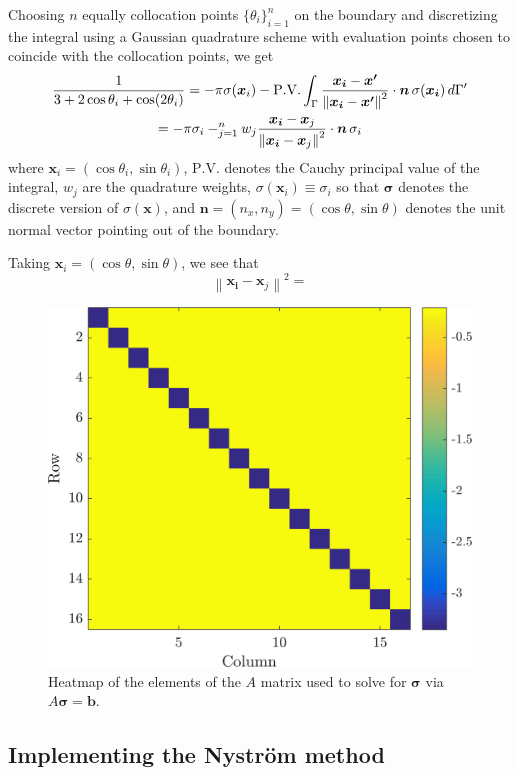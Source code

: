 \documentclass[11pt]{article}
\let\sumop\relax
\newcommand{\norm}[1]{\left\lVert#1\right\rVert}
\begin{document}
Choosing $n$ equally collocation points $\{\theta_i\}_{i=1}^n$ on the boundary and discretizing the integral using a Gaussian quadrature scheme with evaluation points chosen to coincide with the collocation points, we get
\begin{multline*}
  \frac{1}{3 + 2\cos\theta_i + \cos(2\theta_i)}
  = -\pi\sigma(\bm{x}_i) - \mathrm{P.V.}\int_\Gamma \frac{\bm{x_i}-\bm{x'}}{\norm{\bm{x_i}-\bm{x'}}^2} \cdot \bm{n} \, \sigma(\bm{x_i}) \, d\Gamma' \\
  = -\pi \sigma_i - \sumop_{j=1}^n w_j \frac{\bm{x_i}-\bm{x}_j}{\norm{\bm{x_i}-\bm{x}_j}^2} \cdot \bm{n} \, \sigma_i
\end{multline*}
where $\bm{x}_i = (\cos\theta_i, \sin\theta_i)$, $\mathrm{P.V.}$ denotes the Cauchy principal value of the integral, $w_j$ are the quadrature weights, $\sigma(\bm{x}_i) \equiv \sigma_i$ so that $\bm{\sigma}$ denotes the discrete version of $\sigma(\bm{x})$, and $\bm{n} = (n_x, n_y) = (\cos\theta, \sin\theta)$ denotes the unit normal vector pointing out of the boundary.

Taking $\bm{x}_i = (\cos\theta, \sin\theta)$, we see that
\begin{equation*}
  \norm{\bm{x_i}-\bm{x}_j}^2 = 
\end{equation*}

\begin{figure}[!htb]
  \centering
  \includegraphics[width=0.7\linewidth]{matrix_heatmap.png}
  \caption{Heatmap of the elements of the $A$ matrix used to solve for $\bm{\sigma}$ via $A\bm{\sigma} = \bm{b}$.}
  \label{fig:matrix_heatmap}
\end{figure}

\subsection{Implementing the Nyström method}
\end{document}
